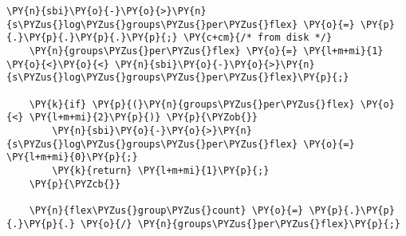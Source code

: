 \begin{Verbatim}[commandchars=\\\{\},codes={\catcode`\$=3\catcode`\^=7\catcode`\_=8}]
    \PY{n}{sbi}\PY{o}{-}\PY{o}{>}\PY{n}{s\PYZus{}log\PYZus{}groups\PYZus{}per\PYZus{}flex} \PY{o}{=} \PY{p}{.}\PY{p}{.}\PY{p}{.}\PY{p}{;} \PY{c+cm}{/* from disk */}
    \PY{n}{groups\PYZus{}per\PYZus{}flex} \PY{o}{=} \PY{l+m+mi}{1} \PY{o}{<}\PY{o}{<} \PY{n}{sbi}\PY{o}{-}\PY{o}{>}\PY{n}{s\PYZus{}log\PYZus{}groups\PYZus{}per\PYZus{}flex}\PY{p}{;}

    \PY{k}{if} \PY{p}{(}\PY{n}{groups\PYZus{}per\PYZus{}flex} \PY{o}{<} \PY{l+m+mi}{2}\PY{p}{)} \PY{p}{\PYZob{}}
        \PY{n}{sbi}\PY{o}{-}\PY{o}{>}\PY{n}{s\PYZus{}log\PYZus{}groups\PYZus{}per\PYZus{}flex} \PY{o}{=} \PY{l+m+mi}{0}\PY{p}{;}
        \PY{k}{return} \PY{l+m+mi}{1}\PY{p}{;}
    \PY{p}{\PYZcb{}}

    \PY{n}{flex\PYZus{}group\PYZus{}count} \PY{o}{=} \PY{p}{.}\PY{p}{.}\PY{p}{.} \PY{o}{/} \PY{n}{groups\PYZus{}per\PYZus{}flex}\PY{p}{;}
\end{Verbatim}
